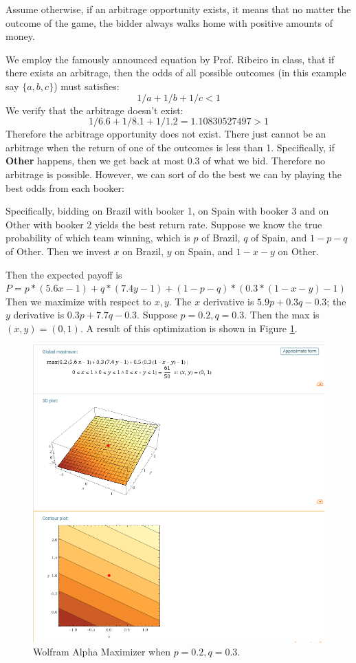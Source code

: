 \documentclass{cisXXX} %
\begin{document}
\maketitle
\HWproblem
Assume otherwise, if an arbitrage opportunity exists, it means that no matter the outcome of the game, the bidder always walks home with positive amounts of money. 

We employ the famously announced equation by Prof. Ribeiro in class, that if there exists an arbitrage, then the odds of all possible outcomes (in this example say $\{a, b, c\}$) must satisfies:
$$
1/a + 1/b + 1/c < 1
$$
We verify that the arbitrage doesn't exist:
$$
1/6.6 + 1/8.1 + 1/1.2 = 1.10830527497 > 1
$$
Therefore the arbitrage opportunity does not exist.
\HWproblem
There just cannot be an arbitrage when the return of one of the outcomes is less than 1. Specifically, if \textbf{Other} happens, then we get back at most 0.3 of what we bid. Therefore no arbitrage is possible. However, we can sort of do the best we can by playing the best odds from each booker: 

Specifically, bidding on Brazil with booker 1, on Spain with booker 3 and on Other with booker 2 yields the best return rate. Suppose we know the true probability of which team winning, which is $p$ of Brazil, $q$ of Spain, and $1-p-q$ of Other. Then we invest $x$ on Brazil, $y$ on Spain, and $1 - x -y$ on Other.

Then the expected payoff is $P = p * (5.6x - 1) + q*(7.4y - 1) + (1-p-q) * (0.3 * (1 - x - y) - 1)$ 
Then we maximize with respect to $x, y$. The $x$ derivative is $5.9p + 0.3q -0.3$; the $y$ derivative is $0.3p + 7.7q -0.3$. Suppose $p = 0.2, q = 0.3$. Then the max is $(x, y) = (0, 1)$.
A result of this optimization is shown in Figure \ref{fig:Maximize}.
\begin{figure}
  \includegraphics[width=\linewidth]{maximize.png}
  \caption{Wolfram Alpha Maximizer when $p = 0.2, q = 0.3$.}
  \label{fig:Maximize}
\end{figure}
\end{document}
